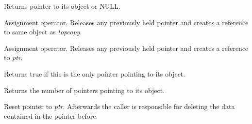 
Returns pointer to its object or NULL.

\label{wxsharedptroperatorassign}


Assignment operator. Releases any previously held pointer
and creates a reference to same object as {\it topcopy}.

\label{wxsharedptroperatorassign2}


Assignment operator. Releases any previously held pointer
and creates a reference to {\it ptr}.

\label{wxsharedptrunique}


Returns true if this is the only pointer pointing to its object.

\label{wxsharedptruse\_count}


Returns the number of pointers pointing to its object.

\label{wxsharedptrreset}


Reset pointer to {\it ptr}. Afterwards the caller is responsible
for deleting the data contained in the pointer before.

